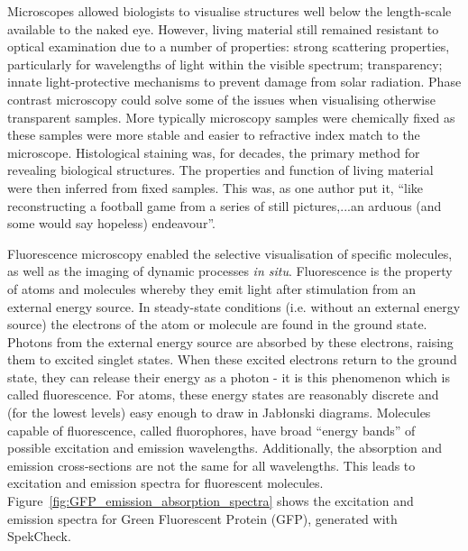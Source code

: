 Microscopes allowed biologists to visualise structures well below the 
length-scale available to the naked eye. However, living material still 
remained resistant to optical examination due to a number of properties: 
strong scattering properties, particularly for wavelengths of light 
within the visible spectrum; transparency; innate light-protective 
mechanisms to prevent damage from solar radiation. Phase contrast 
microscopy could solve some of the issues when visualising otherwise 
transparent samples\cite{burch1942phase}. More typically microscopy 
samples were chemically fixed as these samples were more stable and 
easier to refractive index match to the microscope. Histological staining 
was, for decades, the primary method for revealing biological structures\cite{alturkistani2016histological}. The properties and function 
of living material were then inferred from fixed samples. This was, as one 
author put it, ``like reconstructing a football game from a series of still 
pictures,...an arduous (and some would say hopeless) 
endeavour''\cite{yuste2005fluorescence}. 

Fluorescence microscopy enabled the selective visualisation of specific 
molecules, as well as the imaging of dynamic processes \textit{in situ}. 
Fluorescence is the property of atoms and molecules whereby they emit light
after stimulation from an external energy source. In steady-state conditions 
(i.e. without an external energy source) the electrons of the atom or  
molecule are found in the ground state. Photons from the external energy  
source are absorbed by these electrons, raising them to excited singlet 
states. When these excited electrons return to the ground state, they can 
release their energy as a photon - it is this phenomenon which is called 
fluorescence\cite{ghiran2011introduction}. For atoms, these energy states are
reasonably discrete and (for the lowest levels) easy enough to draw in 
Jab\l{}onski diagrams. Molecules capable of fluorescence, called 
fluorophores, have broad ``energy bands'' of possible excitation and emission 
wavelengths. Additionally, the absorption and emission cross-sections are not 
the same for all wavelengths. This leads to excitation and emission spectra 
for fluorescent molecules. Figure~\ref{fig:GFP_emission_absorption_spectra} 
shows the excitation and emission spectra for Green Fluorescent Protein 
(GFP), generated with SpekCheck\cite{phillips2018spekcheck}.


